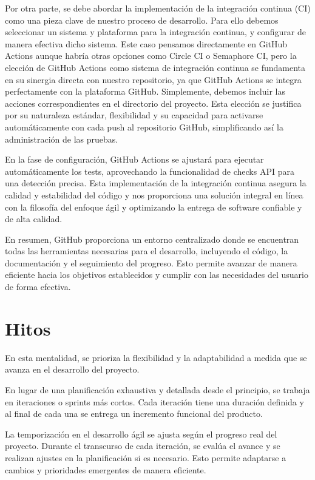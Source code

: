 Por otra parte, se debe abordar la implementación de la integración continua (CI) \cite{CI_supp} como una pieza 
clave de nuestro proceso de desarrollo. Para ello debemos seleccionar un sistema y plataforma para la integración 
continua, y configurar de manera efectiva dicho sistema. Este caso pensamos directamente en GitHub Actions aunque 
habría otras opciones como Circle CI o Semaphore CI, pero la elección de GitHub Actions como sistema de integración 
continua se fundamenta en su sinergia directa con nuestro repositorio, ya que GitHub Actions se integra 
perfectamente con la plataforma GitHub. Simplemente, debemos incluir las acciones correspondientes en el directorio 
del proyecto. Esta elección se justifica por su naturaleza estándar, flexibilidad y su capacidad para activarse 
automáticamente con cada push al repositorio GitHub, simplificando así la administración de las pruebas. 

En la fase de configuración, GitHub Actions se ajustará para ejecutar automáticamente los tests, aprovechando la 
funcionalidad de checks API para una detección precisa. Esta implementación de la integración continua asegura la 
calidad y estabilidad del código y nos proporciona una solución integral en línea con la filosofía del enfoque ágil 
y optimizando la entrega de software confiable y de alta calidad.

En resumen, GitHub proporciona un entorno centralizado donde se encuentran todas las herramientas necesarias para el desarrollo, incluyendo el código, la documentación y el seguimiento del progreso. Esto permite avanzar de manera eficiente hacia los objetivos establecidos y cumplir con las necesidades del usuario de forma efectiva.

\section{Hitos}

En esta mentalidad, se prioriza la flexibilidad y la adaptabilidad a medida que se avanza en el desarrollo del proyecto.

En lugar de una planificación exhaustiva y detallada desde el principio, se trabaja en iteraciones o sprints más cortos. Cada iteración tiene una duración definida y al final de cada una se entrega un incremento funcional del producto.

La temporización en el desarrollo ágil se ajusta según el progreso real del proyecto. Durante el transcurso de cada iteración, se evalúa el avance y se realizan ajustes en la planificación si es necesario. Esto permite adaptarse a cambios y prioridades emergentes de manera eficiente.

